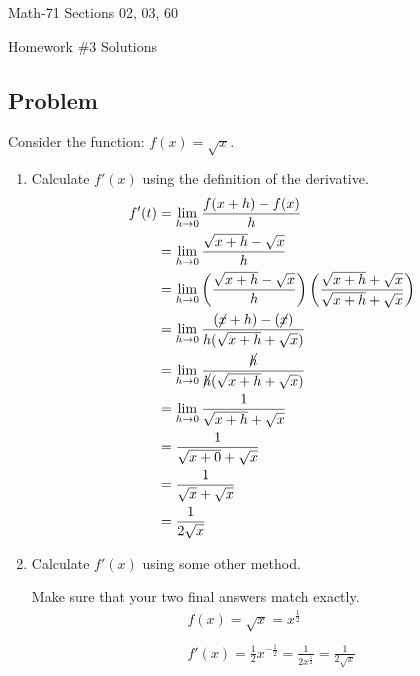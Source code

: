 \documentclass[letterpaper,12pt,fleqn]{article}
\begin{document}
\begin{center}
  \large
  Math-71 Sections 02, 03, 60

  \Large
  Homework \#3 Solutions
\end{center}

\subsection*{Problem}

Consider the function: \(f(x)=\sqrt{x}\).
\begin{enumerate}
\item Calculate \(f'(x)\) using the definition of the derivative.
  \begin{align*}
    f'(t) &= \lim_{h\to0}\frac{f(x+h)-f(x)}{h} \\
    &= \lim_{h\to0}\frac{\sqrt{x+h}-\sqrt{x}}{h} \\
    &= \lim_{h\to0}\left(\frac{\sqrt{x+h}-\sqrt{x}}{h}\right)
    \left(\frac{\sqrt{x+h}+\sqrt{x}}{\sqrt{x+h}+\sqrt{x}}\right) \\
    &= \lim_{h\to0}\frac{(\cancel{x}+h)-(\cancel{x})}{h(\sqrt{x+h}+\sqrt{x})} \\
    &= \lim_{h\to0}\frac{\cancel{h}}{\cancel{h}(\sqrt{x+h}+\sqrt{x})} \\
    &= \lim_{h\to0}\frac{1}{\sqrt{x+h}+\sqrt{x}} \\
    &= \frac{1}{\sqrt{x+0}+\sqrt{x}} \\
    &= \frac{1}{\sqrt{x}+\sqrt{x}} \\
    &= \frac{1}{2\sqrt{x}}
  \end{align*}
  
\item Calculate \(f'(x)\) using some other method.

  Make sure that your two final answers match exactly.
  \begin{gather*}
    f(x)=\sqrt{x}=x^{\frac{1}{2}} \\
    \\
    f'(x)=\frac{1}{2}x^{-\frac{1}{2}}=\frac{1}{2x^{\frac{1}{2}}}=\frac{1}{2\sqrt{x}}
  \end{gather*}
\end{enumerate}
\end{document}
